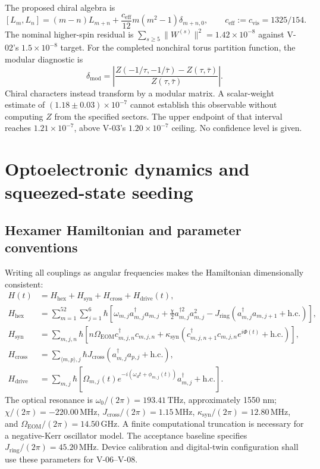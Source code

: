 \documentclass[11pt,a4paper]{article}
\newcommand{\unit}[1]{\,\mathrm{#1}}
\begin{document}
The proposed chiral algebra is
\[
 [L_m,L_n]=(m-n)L_{m+n}+\frac{c_{\mathrm{eff}}}{12}m(m^2-1)\delta_{m+n,0},
 \qquad c_{\mathrm{eff}}:=c_{\mathrm{vis}}=1325/154.
\]
The nominal higher-spin residual is $\sum_{s\ge5}\|W^{(s)}\|^2=1.42\times10^{-8}$
against V-02's $1.5\times10^{-8}$ target. For the completed nonchiral torus partition
function, the modular diagnostic is
\[
 \delta_{\mathrm{mod}}=\left|
 \frac{Z(-1/\tau,-1/\bar\tau)-Z(\tau,\bar\tau)}{Z(\tau,\bar\tau)}\right|.
\]
Chiral characters instead transform by a modular matrix. A scalar-weight estimate of
$(1.18\pm0.03)\times10^{-7}$ cannot establish this observable without
computing $Z$ from the specified sectors. The upper endpoint of that interval reaches
$1.21\times10^{-7}$, above V-03's $1.20\times10^{-7}$ ceiling. No confidence level is given.

\section{Optoelectronic dynamics and squeezed-state seeding}
\label{sec:hw}
\subsection{Hexamer Hamiltonian and parameter conventions}
Writing all couplings as angular frequencies makes the Hamiltonian dimensionally consistent:
\begin{align}
 H(t)&=H_{\mathrm{hex}}+H_{\mathrm{syn}}+H_{\mathrm{cross}}+H_{\mathrm{drive}}(t),\\
 H_{\mathrm{hex}}&=\sum_{m=1}^{52}\sum_{j=1}^{6}\hbar\left[
 \omega_{m,j}a^\dagger_{m,j}a_{m,j}+\frac{\chi}{2}a^{\dagger2}_{m,j}a^2_{m,j}
 -J_{\mathrm{ring}}(a^\dagger_{m,j}a_{m,j+1}+\mathrm{h.c.})\right],\\
 H_{\mathrm{syn}}&=\sum_{m,j,n}\hbar\left[n\Omega_{\mathrm{EOM}}c^\dagger_{m,j,n}c_{m,j,n}
 +\kappa_{\mathrm{syn}}(c^\dagger_{m,j,n+1}c_{m,j,n}e^{i\Phi(t)}+\mathrm{h.c.})\right],\\
 H_{\mathrm{cross}}&=\sum_{\langle m,p\rangle,j}\hbar J_{\mathrm{cross}}
 (a^\dagger_{m,j}a_{p,j}+\mathrm{h.c.}),\\
 H_{\mathrm{drive}}&=\sum_{m,j}\hbar\left[\Omega_{m,j}(t)
 e^{-i(\omega_dt+\phi_{m,j}(t))}a^\dagger_{m,j}+\mathrm{h.c.}\right].
\end{align}
The optical resonance is $\omega_0/(2\pi)=193.41\unit{THz}$, approximately 1550 nm;
$\chi/(2\pi)=-220.00\unit{MHz}$, $J_{\mathrm{cross}}/(2\pi)=1.15\unit{MHz}$,
$\kappa_{\mathrm{syn}}/(2\pi)=12.80\unit{MHz}$, and
$\Omega_{\mathrm{EOM}}/(2\pi)=14.50\unit{GHz}$. A finite computational truncation is necessary
for a negative-Kerr oscillator model. The acceptance baseline specifies
$J_{\mathrm{ring}}/(2\pi)=45.20\unit{MHz}$. Device calibration and digital-twin
configuration shall use these parameters for V-06--V-08.
\end{document}
